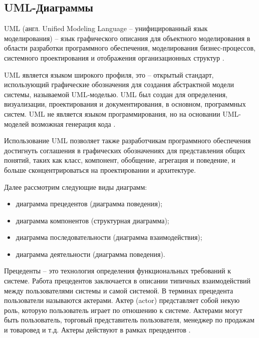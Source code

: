 \subsection{UML-Диаграммы}

UML (англ. Unified Modeling Language – унифицированный язык моделирования) – язык графического описания для объектного моделирования в области разработки программного обеспечения, моделирования бизнес-процессов, системного проектирования и отображения организационных структур \cite{uml}. 

UML является языком широкого профиля, это – открытый стандарт, использующий графические обозначения для создания абстрактной модели системы, называемой UML-моделью. UML был создан для определения, визуализации, проектирования и документирования, в основном, программных систем. UML не является языком программирования, но на основании UML-моделей возможная генерация кода \cite{uml}. 

Использование UML позволяет также разработчикам программного обеспечения достигнуть соглашения в графических обозначениях для представления общих понятий, таких как класс, компонент, обобщение, агрегация и поведение, и больше сконцентрироваться на проектировании и архитектуре. 

Далее рассмотрим следующие виды диаграмм:
\begin{itemize}
	\item диаграмма прецедентов (диаграмма поведения);
	\item диаграмма компонентов (структурная диаграмма);
	\item диаграмма последовательности (диаграмма взаимодействия);
	\item диаграмма деятельности (диаграмма поведения).
\end{itemize}

Прецеденты – это технология определения функциональных требований к системе. Работа прецедентов заключается в описании типичных взаимодействий между пользователями системы и самой системой. В терминах прецедента пользователи называются актерами. Актер (actor) представляет собой некую роль, которую пользователь играет по отношению к системе. Актерами могут быть пользователь, торговый представитель пользователя, менеджер по продажам и товаровед и т.д. Актеры действуют в рамках прецедентов \cite{uml}.





